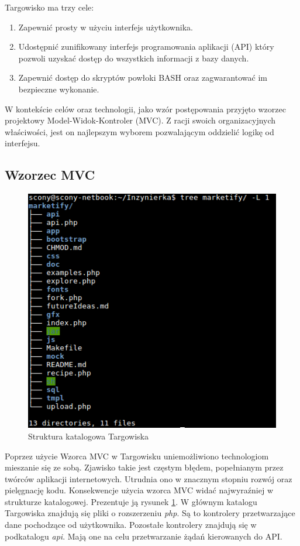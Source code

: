 \documentclass[11pt,a4paper,polish,thesis]{dcsbook}
\begin{document}
Targowisko ma trzy cele:
\begin{enumerate}
\item Zapewnić prosty w użyciu interfejs użytkownika.
\item Udostępnić zunifikowany interfejs programowania aplikacji (API) który pozwoli uzyskać dostęp do wszystkich informacji z bazy danych.
\item Zapewnić dostęp do skryptów powłoki BASH oraz zagwarantować im bezpieczne wykonanie.
\end{enumerate}

W kontekście celów oraz technologii, jako wzór postępowania przyjęto wzorzec projektowy Model-Widok-Kontroler (MVC). Z racji swoich organizacyjnych właściwości, jest
on najlepszym wyborem pozwalającym oddzielić logikę od interfejsu.
\subsection{Wzorzec MVC}
\begin{figure}[H]
  \centering
  \includegraphics[scale=0.7]{./resources/market_tree.png}
  \caption{Struktura katalogowa Targowiska}
  \label{fig:market_tree}
\end{figure}
Poprzez użycie Wzorca MVC w Targowisku uniemożliwiono technologiom mieszanie się ze sobą. Zjawisko takie jest częstym błędem, popełnianym przez twórców aplikacji
internetowych. Utrudnia ono w znacznym stopniu rozwój oraz pielęgnację kodu. Konsekwencje użycia wzorca MVC widać najwyraźniej w strukturze katalogowej.
Prezentuje ją rysunek \ref{fig:market_tree}.
W głównym katalogu Targowiska znajdują się pliki o rozszerzeniu \emph{php}. Są to kontrolery przetwarzające dane pochodzące od użytkownika. Pozostałe kontrolery
znajdują się w podkatalogu \emph{api}. Mają one na celu przetwarzanie żądań kierowanych do API.
\end{document}
